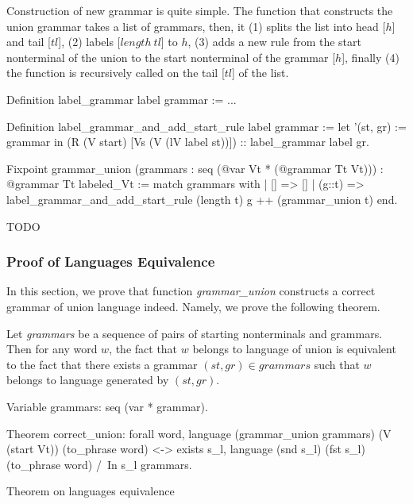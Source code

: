 Construction of new grammar is quite simple. The function that constructs the union grammar takes a list of grammars, then, it (1) splits the list into head [$h$] and tail [$tl$], (2) labels [$length \ tl$] to $h$, (3) adds a new rule from the start nonterminal of the union to the start nonterminal of the grammar [$h$], finally (4) the function is recursively called on the tail [$tl$] of the list.

\begin{listing}[h]
    \begin{pyglist}[language=coq, numbers=none, numbersep=5pt]
  Definition label_grammar label grammar := ...

  Definition label_grammar_and_add_start_rule 
               label 
               grammar :=
    let '(st, gr) := grammar in 
    (R (V start) [Vs (V (lV label st))]) 
       :: label_grammar label gr.        

  Fixpoint grammar_union 
     (grammars : seq (@var Vt * (@grammar Tt Vt)))
       : @grammar 
     Tt 
     labeled_Vt :=
    match grammars with
    |  [] => []
    |  (g::t) => 
         label_grammar_and_add_start_rule 
           (length t) 
           g ++ (grammar_union t)
    end.
    \end{pyglist}
    \caption{TODO}
    \label{lst:verbments1}
\end{listing}

\subsubsection{Proof of Languages Equivalence}

In this section, we prove that function \textit{grammar\_union} constructs a correct grammar of union language indeed. Namely, we prove the following theorem.

\begin{theorem}\label{theorem-correct-union}
    Let \textit{grammars} be a sequence of pairs of starting nonterminals and grammars. Then for any word $w$, the fact that $w$ belongs to language of union is equivalent to the fact that there exists a grammar $(st,gr) \in \textit{grammars}$ such that $w$ belongs to language generated by $(st,gr)$.
\end{theorem}

\begin{listing}[h]
    \begin{pyglist}[language=coq, numbers=none, numbersep=5pt]
  Variable grammars: seq (var * grammar).

  Theorem correct_union:
    forall word, 
      language (grammar_union grammars) 
        (V (start Vt)) (to_phrase word) <->
      exists s_l, 
        language (snd s_l) (fst s_l) 
          (to_phrase word) /\ 
        In s_l grammars.
    \end{pyglist}
    \caption{Theorem on languages equivalence}
    \label{lst:lang-eq}
\end{listing}


